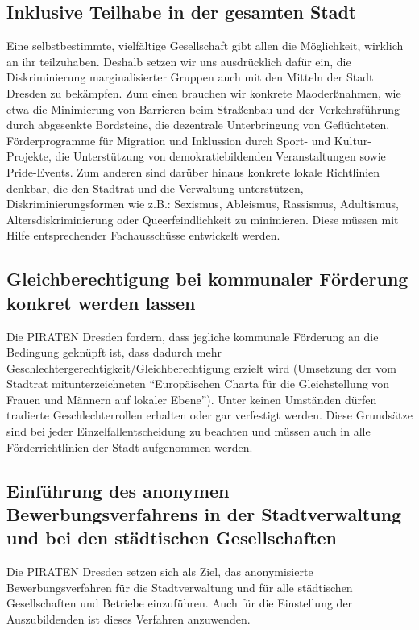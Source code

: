 \documentclass[a4paper, 11pt]{article}
\begin{document}
\subsection{Inklusive Teilhabe in der gesamten Stadt}
Eine selbstbestimmte, vielfältige Gesellschaft gibt allen die Möglichkeit, wirklich an ihr teilzuhaben. Deshalb setzen wir uns ausdrücklich dafür ein, die Diskriminierung marginalisierter Gruppen auch mit den Mitteln der Stadt Dresden zu bekämpfen. Zum einen brauchen wir konkrete Maoderßnahmen, wie etwa die Minimierung von Barrieren beim Straßenbau und der Verkehrsführung durch abgesenkte Bordsteine, die dezentrale Unterbringung von Geflüchteten, Förderprogramme für Migration und Inklussion durch Sport- und Kultur-Projekte, die Unterstützung von demokratiebildenden Veranstaltungen sowie Pride-Events. Zum anderen sind darüber hinaus konkrete lokale Richtlinien denkbar, die den Stadtrat und die Verwaltung unterstützen, Diskriminierungsformen wie z.B.: Sexismus, Ableismus, Rassismus, Adultismus, Altersdiskriminierung oder Queerfeindlichkeit zu minimieren. Diese müssen mit Hilfe entsprechender Fachausschüsse entwickelt werden.


\subsection{Gleichberechtigung bei kommunaler Förderung konkret werden lassen}
Die PIRATEN Dresden fordern, dass jegliche kommunale Förderung an die Bedingung geknüpft ist, dass dadurch mehr Geschlechtergerechtigkeit/Gleichberechtigung erzielt wird (Umsetzung der vom Stadtrat mitunterzeichneten ``Europäischen Charta für die Gleichstellung von Frauen und Männern auf lokaler Ebene''). Unter keinen Umständen dürfen tradierte Geschlechterrollen erhalten oder gar verfestigt werden. Diese Grundsätze sind bei jeder Einzelfallentscheidung zu beachten und müssen auch in alle Förderrichtlinien der Stadt aufgenommen werden.



\subsection{Einführung des anonymen Bewerbungsverfahrens in der Stadtverwaltung und bei den städtischen Gesellschaften}
Die PIRATEN Dresden setzen sich als Ziel, das anonymisierte Bewerbungsverfahren für die Stadtverwaltung und für alle städtischen Gesellschaften und Betriebe einzuführen. Auch für die Einstellung der Auszubildenden ist dieses Verfahren anzuwenden.
\end{document}
